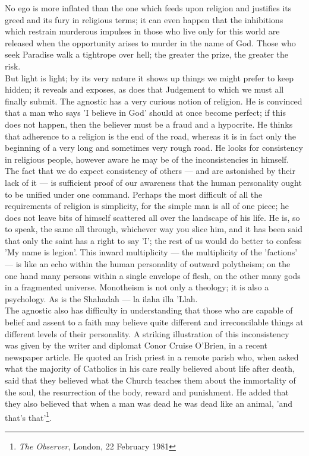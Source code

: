 \documentclass[11pt, b5paper, twoside]{book}
\begin{document}
No ego is more inflated than the one which feeds upon religion and justifies its greed and its fury 
in religious terms; it can even happen that the inhibitions which restrain murderous impulses in 
those who live only for this world are released when the opportunity arises to murder in the name of 
God. Those who seek Paradise walk a tightrope over hell; the greater the prize, the greater the risk. \\

But light is light; by its very nature it shows up things we might prefer to keep hidden; it reveals 
and exposes, as does that Judgement to which we must all finally submit. The agnostic has a very 
curious notion of religion. He is convinced that a man who says 'I believe in God' should at once 
become perfect; if this does not happen, then the believer must be a fraud and a hypocrite. He thinks 
that adherence to a religion is the end of the road, whereas it is in fact only the beginning of a 
very long and sometimes very rough road. He looks for consistency in religious people, however aware 
he may be of the inconsistencies in himself. \\

The fact that we do expect consistency of others --- and are astonished by their lack of it --- is 
sufficient proof of our awareness that the human personality ought to be unified under one command. 
Perhaps the most difficult of all the requirements of religion is simplicity, for the simple man is 
all of one piece; he does not leave bits of himself scattered all over the landscape of his life. He 
is, so to speak, the same all through, whichever way you slice him, and it has been said that only 
the saint has a right to say 'I'; the rest of us would do better to confess 'My name is legion'. This 
inward multiplicity --- the multiplicity of the 'factions' --- is like an echo within the human 
personality of outward polytheism; on the one hand many persons within a single envelope of flesh, on 
the other many gods in a fragmented universe. Monotheism is not only a theology; it is also a 
psychology. As is the Shahadah --- la ilaha illa 'Llah. \\

The agnostic also has difficulty in understanding that those who are capable of belief and assent to 
a faith may believe quite different and irreconcilable things at different levels of their 
personality. A striking illustration of this inconsistency was given by the writer and diplomat Conor 
Cruise O'Brien, in a recent newspaper article. He quoted an Irish priest in a remote parish who, when 
asked what the majority of Catholics in his care really believed about life after death, said that 
they believed what the Church teaches them about the immortality of the soul, the resurrection of the 
body, reward and punishment. He added that they also believed that when a man was dead he was dead 
like an animal, 'and that's that'\footnote{\emph{The Observer}, London, 22 February 1981}.\\
\end{document}
